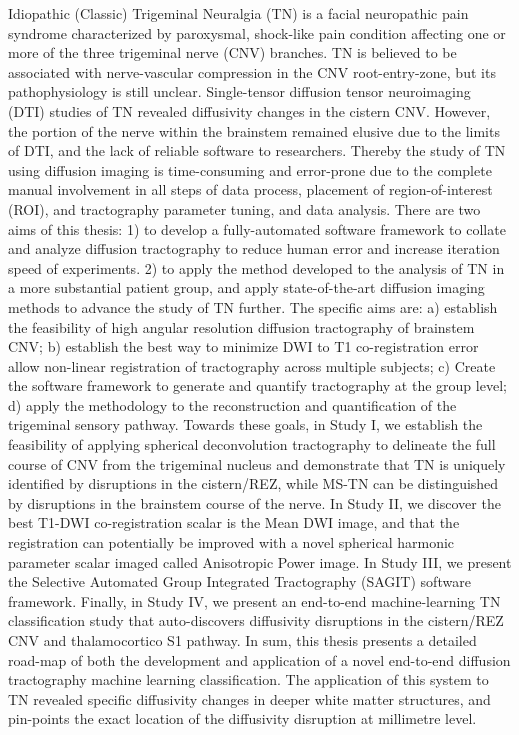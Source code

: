 Idiopathic (Classic) Trigeminal Neuralgia (TN) is a facial neuropathic pain syndrome characterized by paroxysmal, shock-like pain condition affecting one or more of the three trigeminal nerve (CNV) branches. TN is believed to be associated with nerve-vascular compression in the CNV root-entry-zone, but its pathophysiology is still unclear. Single-tensor diffusion tensor neuroimaging (DTI) studies of TN revealed diffusivity changes in the cistern CNV. However, the portion of the nerve within the brainstem remained elusive due to the limits of DTI, and the lack of reliable software to researchers. Thereby the study of TN using diffusion imaging is time-consuming and error-prone due to the complete manual involvement in all steps of data process, placement of region-of-interest (ROI), and tractography parameter tuning, and data analysis. 
There are two aims of this thesis: 1) to develop a fully-automated software framework to collate and analyze diffusion tractography to reduce human error and increase iteration speed of experiments. 2) to apply the method developed to the analysis of TN in a more substantial patient group, and apply state-of-the-art diffusion imaging methods to advance the study of TN further. 
The specific aims are: a) establish the feasibility of high angular resolution diffusion tractography of brainstem CNV; b) establish the best way to minimize DWI to T1 co-registration error allow non-linear registration of tractography across multiple subjects; c) Create the software framework to generate and quantify tractography at the group level; d) apply the methodology to the reconstruction and quantification of the trigeminal sensory pathway. 
Towards these goals, in Study I, we establish the feasibility of applying spherical deconvolution tractography to delineate the full course of CNV from the trigeminal nucleus and demonstrate that TN is uniquely identified by disruptions in the cistern/REZ, while MS-TN can be distinguished by disruptions in the brainstem course of the nerve. In Study II, we discover the best T1-DWI co-registration scalar is the Mean DWI image, and that the registration can potentially be improved with a novel spherical harmonic parameter scalar imaged called Anisotropic Power image. In Study III, we present the Selective Automated Group Integrated Tractography (SAGIT) software framework. Finally, in Study IV, we present an end-to-end machine-learning TN classification study that auto-discovers diffusivity disruptions in the cistern/REZ CNV and thalamocortico S1 pathway. 
In sum, this thesis presents a detailed road-map of both the development and application of a novel end-to-end diffusion tractography machine learning classification. The application of this system to TN revealed specific diffusivity changes in deeper white matter structures, and pin-points the exact location of the diffusivity disruption at millimetre level. 